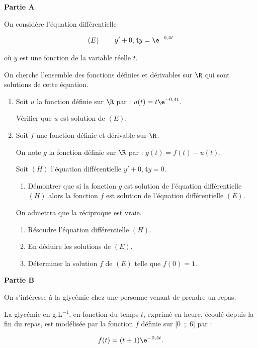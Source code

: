 \medskip

\textbf{Partie A}

\medskip

On considère l'équation différentielle

\[(E)\: \qquad y' + 0,4y = \e^{-0,4t}\]

où $y$ est une fonction de la variable réelle $t$.

On cherche l'ensemble des fonctions définies et dérivables sur $\R$ qui sont solutions
de cette équation.

\medskip

\begin{enumerate}
\item Soit $u$ la fonction définie sur $\R$ par : $u(t) = t\e^{-0,4t}$.

Vérifier que $u$ est solution de $(E)$.
\item Soit $f$ une fonction définie et dérivable sur $\R$.

On note $g$ la fonction définie sur $\R$ par : $g(t) = f(t) - u(t)$.

Soit $(H)$ l'équation différentielle $y' + 0,4y = 0$.
	\begin{enumerate}
		\item Démontrer que si la fonction $g$ est solution de l'équation différentielle $(H)$ alors la fonction $f$ est solution de l'équation différentielle $(E)$.
	\end{enumerate}		
		
On admettra que la réciproque est vraie.

	\begin{enumerate}[resume]
		\item Résoudre l'équation différentielle $(H)$.
		\item En déduire les solutions de $(E)$.
		\item Déterminer la solution $f$ de $(E)$ telle que $f(0) = 1$.
	\end{enumerate}
\end{enumerate}

\bigskip

\textbf{Partie B}

\medskip

On s'intéresse à la glycémie chez une personne venant de prendre un repas.

La glycémie en g.L$^{-1}$, en fonction du temps $t$, exprimé en heure, écoulé depuis la fin
du repas, est modélisée par la fonction $f$ définie sur [0~;~6] par :

\[f(t) = (t + 1)\e^{-0,4t}.\]

